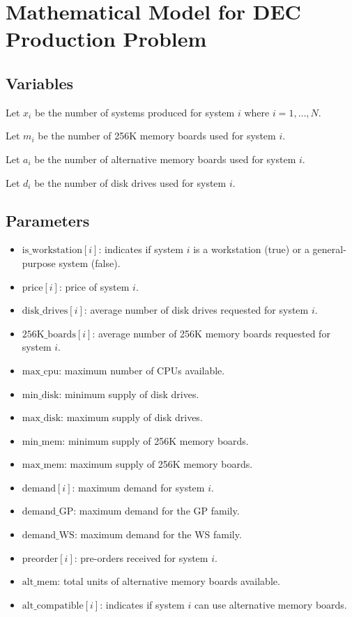 \documentclass{article}
\begin{document}
\section*{Mathematical Model for DEC Production Problem}

\subsection*{Variables}
Let \( x_i \) be the number of systems produced for system \( i \) where \( i = 1, \ldots, N \).

Let \( m_i \) be the number of 256K memory boards used for system \( i \).

Let \( a_i \) be the number of alternative memory boards used for system \( i \).

Let \( d_i \) be the number of disk drives used for system \( i \).

\subsection*{Parameters}
\begin{itemize}
    \item \( \text{is\_workstation}[i] \): indicates if system \( i \) is a workstation (true) or a general-purpose system (false).
    \item \( \text{price}[i] \): price of system \( i \).
    \item \( \text{disk\_drives}[i] \): average number of disk drives requested for system \( i \).
    \item \( \text{256K\_boards}[i] \): average number of 256K memory boards requested for system \( i \).
    \item \( \text{max\_cpu} \): maximum number of CPUs available.
    \item \( \text{min\_disk} \): minimum supply of disk drives.
    \item \( \text{max\_disk} \): maximum supply of disk drives.
    \item \( \text{min\_mem} \): minimum supply of 256K memory boards.
    \item \( \text{max\_mem} \): maximum supply of 256K memory boards.
    \item \( \text{demand}[i] \): maximum demand for system \( i \).
    \item \( \text{demand\_GP} \): maximum demand for the GP family.
    \item \( \text{demand\_WS} \): maximum demand for the WS family.
    \item \( \text{preorder}[i] \): pre-orders received for system \( i \).
    \item \( \text{alt\_mem} \): total units of alternative memory boards available.
    \item \( \text{alt\_compatible}[i] \): indicates if system \( i \) can use alternative memory boards.
\end{itemize}
\end{document}
